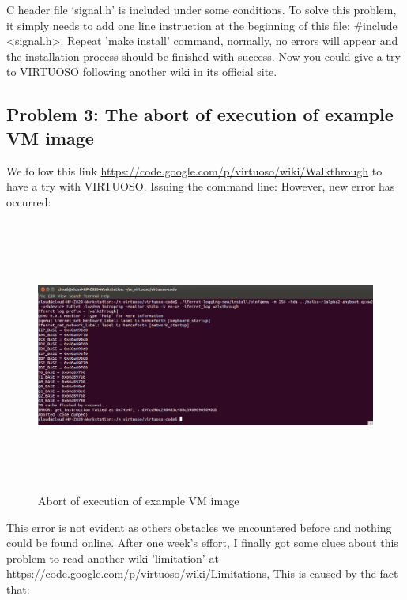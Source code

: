C header file ‘signal.h’ is included under some conditions. To solve this problem, it simply needs to  add one line instruction at the 
beginning of this file: \#include <signal.h>. Repeat 'make install' command, normally, no errors will appear and the installation process 
should be finished with success. Now you could give a try to VIRTUOSO following another wiki in its official site.

\subsection{Problem 3: The abort of execution of example VM image}
We follow this link \url{https://code.google.com/p/virtuoso/wiki/Walkthrough} to have a try with VIRTUOSO. Issuing the command line:
However, new error has occurred:

\begin{figure}[htbp]
	\centering
		\includegraphics[width=14cm, height= 9cm ]{Figures/Figure35.png}
	\caption[Abort of execution of example VM image]{Abort of execution of example VM image}
	\label{fig:Abort of execution of example VM image}
\end{figure}

This error is not evident as others obstacles we encountered before and nothing could be found online. After one week’s effort, 
I finally got some clues about this problem to read another wiki 'limitation' at \url{https://code.google.com/p/virtuoso/wiki/Limitations},
This is caused by the fact that:

